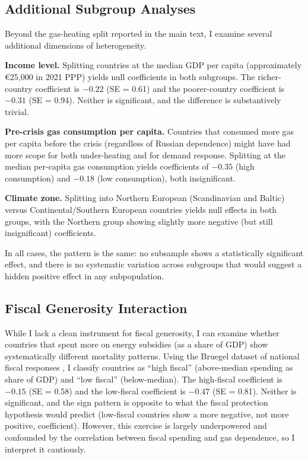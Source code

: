 \documentclass[12pt]{article}
\begin{document}
\subsection{Additional Subgroup Analyses}

Beyond the gas-heating split reported in the main text, I examine several additional dimensions of heterogeneity.

\textbf{Income level.} Splitting countries at the median GDP per capita (approximately \euro 25,000 in 2021 PPP) yields null coefficients in both subgroups. The richer-country coefficient is $-0.22$ (SE = 0.61) and the poorer-country coefficient is $-0.31$ (SE = 0.94). Neither is significant, and the difference is substantively trivial.

\textbf{Pre-crisis gas consumption per capita.} Countries that consumed more gas per capita before the crisis (regardless of Russian dependence) might have had more scope for both under-heating and for demand response. Splitting at the median per-capita gas consumption yields coefficients of $-0.35$ (high consumption) and $-0.18$ (low consumption), both insignificant.

\textbf{Climate zone.} Splitting into Northern European (Scandinavian and Baltic) versus Continental/Southern European countries yields null effects in both groups, with the Northern group showing slightly more negative (but still insignificant) coefficients.

In all cases, the pattern is the same: no subsample shows a statistically significant effect, and there is no systematic variation across subgroups that would suggest a hidden positive effect in any subpopulation.

\subsection{Fiscal Generosity Interaction}

While I lack a clean instrument for fiscal generosity, I can examine whether countries that spent more on energy subsidies (as a share of GDP) show systematically different mortality patterns. Using the Bruegel dataset of national fiscal responses \citep{bruegel2023}, I classify countries as ``high fiscal'' (above-median spending as share of GDP) and ``low fiscal'' (below-median). The high-fiscal coefficient is $-0.15$ (SE = 0.58) and the low-fiscal coefficient is $-0.47$ (SE = 0.81). Neither is significant, and the sign pattern is opposite to what the fiscal protection hypothesis would predict (low-fiscal countries show a more negative, not more positive, coefficient). However, this exercise is largely underpowered and confounded by the correlation between fiscal spending and gas dependence, so I interpret it cautiously.
\end{document}
